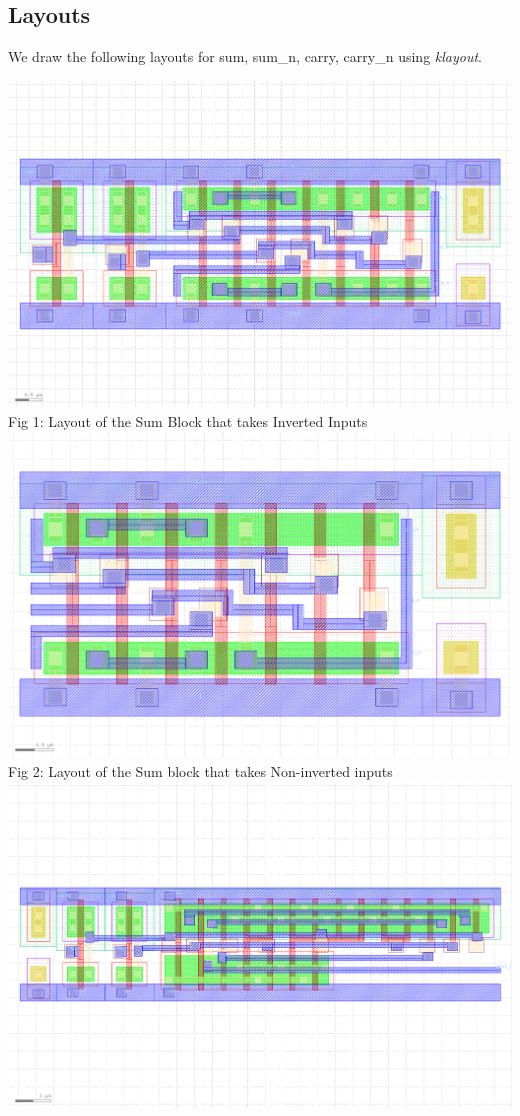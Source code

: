\documentclass[12pt,a4paper]{article}
\begin{document}
\subsection{Layouts}
\noindent We draw the following layouts for sum, sum\_n, carry, carry\_n using \emph{klayout}.
\begin{center}
\includegraphics[width=0.99\linewidth]{tut6/again/sum/sum.gds.png} \\
Fig 1: Layout of the Sum Block that takes Inverted Inputs
\includegraphics[width=0.99\linewidth]{tut6/again/sum_n/sum_n.gds.png} \\
Fig 2: Layout of the Sum block that takes Non-inverted inputs
\includegraphics[width=0.99\linewidth]{tut6/again/carry/carry.gds.png} \\

\end{center}
\end{document}
